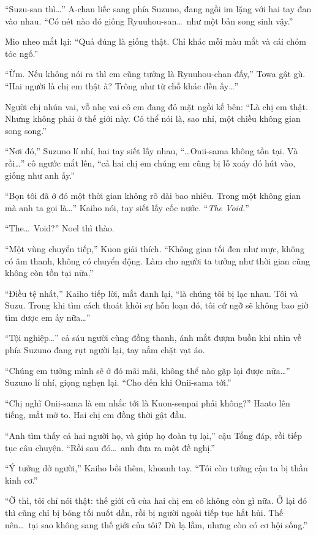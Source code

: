 \documentclass[../main.tex]{subfiles}
\begin{document}
``Suzu-san thì\dots'' A-chan liếc sang phía Suzuno, đang ngồi im lặng với hai tay đan vào nhau. ``Có nét nào đó giống Ryuuhou-san\dots\ như một bản song sinh vậy.''

Mio nheo mắt lại: ``Quả đúng là giống thật. Chỉ khác mỗi màu mắt và cái chỏm tóc ngố.''

``Ừm. Nếu không nói ra thì em cũng tưởng là Ryuuhou-chan đấy,'' Towa gật gù. ``Hai người là chị em thật à? Trông như từ chỗ khác đến ấy\dots''

Người chị nhún vai, vỗ nhẹ vai cô em đang đỏ mặt ngồi kế bên: ``Là chị em thật. Nhưng không phải ở thế giới này. Có thể nói là, sao nhỉ, một chiều không gian song song.''

``Nơi đó,'' Suzuno lí nhí, hai tay siết lấy nhau, ``\dots Onii-sama không tồn tại. Và rồi\dots'' cô ngước mắt lên, ``cả hai chị em chúng em cũng bị lỗ xoáy đó hút vào, giống như anh ấy.''

``Bọn tôi đã ở đó một thời gian không rõ dài bao nhiêu. Trong một không gian mà anh ta gọi là\dots'' Kaiho nói, tay siết lấy cốc nước. ``\emph{The Void.}''

``The\dots\ Void?'' Noel thì thào.

``Một vùng chuyển tiếp,'' Kuon giải thích. ``Không gian tối đen như mực, không có âm thanh, không có chuyển động. Làm cho người ta tưởng như thời gian cũng không còn tồn tại nữa.''

``Điều tệ nhất,'' Kaiho tiếp lời, mắt đanh lại, ``là chúng tôi bị lạc nhau. Tôi và Suzu. Trong khi tìm cách thoát khỏi sự hỗn loạn đó, tôi cứ ngỡ sẽ không bao giờ tìm được em ấy nữa\dots''

``Tội nghiệp\dots'' cả sáu người cùng đồng thanh, ánh mắt đượm buồn khi nhìn về phía Suzuno đang rụt người lại, tay nắm chặt vạt áo.

``Chúng em tưởng mình sẽ ở đó mãi mãi, không thể nào gặp lại được nữa\dots'' Suzuno lí nhí, giọng nghẹn lại. ``Cho đến khi Onii-sama tới.''

``Chị nghĩ Onii-sama là em nhắc tới là Kuon-senpai phải không?'' Haato lên tiếng, mắt mở to. Hai chị em đồng thời gật đầu.

``Anh tìm thấy cả hai người họ, và giúp họ đoàn tụ lại,'' cậu Tổng đáp, rồi tiếp tục câu chuyện. ``Rồi sau đó\dots\ anh đưa ra một đề nghị.''

``Ý tưởng dở người,'' Kaiho bồi thêm, khoanh tay. ``Tôi còn tưởng cậu ta bị thần kinh cơ.''

``Ờ thì, tôi chỉ nói thật: thế giới cũ của hai chị em cô không còn gì nữa. Ở lại đó thì cũng chỉ bị bóng tối nuốt dần, rồi bị người ngoài tiếp tục hắt hủi. Thế nên\dots\ tại sao không sang thế giới của tôi? Dù lạ lẫm, nhưng còn có cơ hội sống.''
\end{document}
